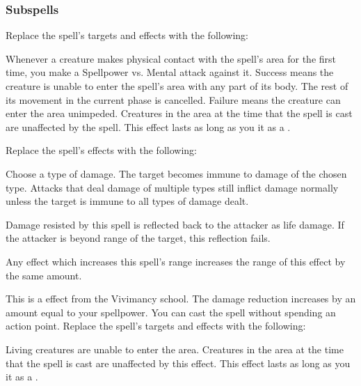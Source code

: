 \subsubsection{Subspells}
Replace the spell's targets and effects with the following:
\begin{spellcontent}
\begin{augmenttargetinginfo}
\end{augmenttargetinginfo}
\begin{augmenteffects}
\spelleffect
Whenever a creature makes physical contact with the spell's area for the first time, you make a Spellpower vs. Mental attack against it.
Success means the creature is unable to enter the spell's area with any part of its body.
The rest of its movement in the current phase is cancelled.
Failure means the creature can enter the area unimpeded.
Creatures in the area at the time that the spell is cast are unaffected by the spell.
This effect lasts as long as you  it as a .
\end{augmenteffects}
\end{spellcontent}
Replace the spell's effects with the following:
\begin{spellcontent}
\begin{augmenteffects}
\spelleffect
Choose a type of damage.
The target becomes immune to damage of the chosen type.
Attacks that deal damage of multiple types still inflict damage normally unless the target is immune to all types of damage dealt.
\end{augmenteffects}
\end{spellcontent}
Damage resisted by this spell is reflected back to the attacker as life damage.
If the attacker is beyond \rngclose range of the target, this reflection fails.
\par Any effect which increases this spell's range increases the range of this effect by the same amount.
\par
This is a  effect from the Vivimancy school.
The damage reduction increases by an amount equal to your spellpower.
You can cast the spell without spending an action point.
Replace the spell's targets and effects with the following:
\begin{spellcontent}
\begin{augmenttargetinginfo}
\end{augmenttargetinginfo}
\begin{augmenteffects}
\spelleffect
Living creatures are unable to enter the area.
Creatures in the area at the time that the spell is cast are unaffected by this effect.
This effect lasts as long as you  it as a .
\end{augmenteffects}
\end{spellcontent}

